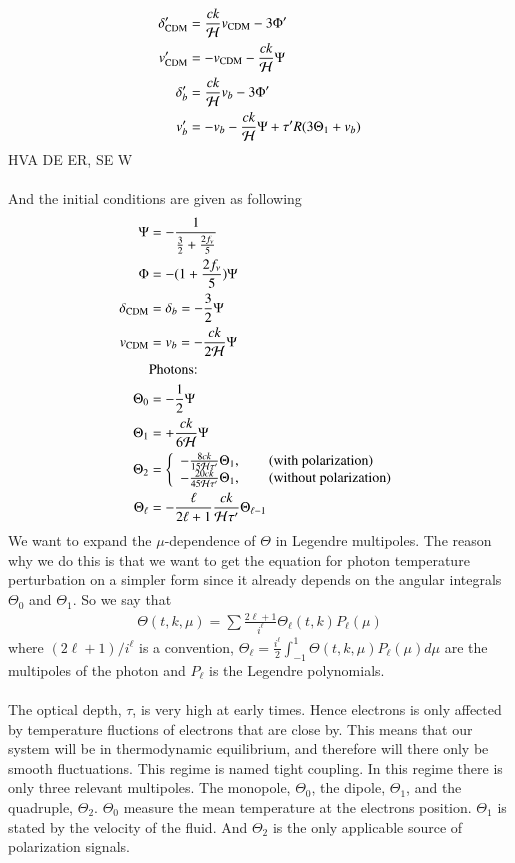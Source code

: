 \documentclass{aa}
\begin{document}
\begin{align}
\delta_{\rm CDM}^\prime &= \frac{ck}{\mathcal{H}} v_{\rm CDM} - 3\Phi^\prime \\
v_{\rm CDM}^\prime &= -v_{\rm CDM} -\frac{ck}{\mathcal{H}} \Psi \\
\delta_b^\prime &= \frac{ck}{\mathcal{H}}v_b -3\Phi^\prime \\
v_b^\prime &= -v_b - \frac{ck}{\mathcal{H}}\Psi + \tau^\prime R(3\Theta_1 + v_b) 
\end{align}
HVA DE ER, SE W\\
\\
And the initial conditions are given as following
\begin{align*}
\Psi &= -\frac{1}{\frac{3}{2} + \frac{2f_\nu}{5}}\\
\Phi &= -(1+\frac{2f_\nu}{5})\Psi \\
\delta_{\rm CDM} &= \delta_b = -\frac{3}{2} \Psi \\
v_{\rm CDM} &= v_b = -\frac{ck}{2\mathcal{H}} \Psi\\
&\text{Photons:}\\
\Theta_0 &= -\frac{1}{2} \Psi \\
\Theta_1 &= +\frac{ck}{6\mathcal{H}}\Psi \\
\Theta_2 &= \left\{
\begin{array}{l}
-\frac{8ck}{15\mathcal{H}\tau^\prime} \Theta_1, \quad\quad \textrm{(with polarization)} \\
-\frac{20ck}{45\mathcal{H}\tau^\prime} \Theta_1, \quad\quad \textrm{(without polarization)}
\end{array}\right. \\
\Theta_\ell &= -\frac{\ell}{2\ell+1} \frac{ck}{\mathcal{H}\tau^\prime} \Theta_{\ell-1}
\end{align*}
We want to expand the $\mu$-dependence of $\Theta$ in Legendre multipoles. The reason why we do this is that we want to get the equation for photon temperature perturbation on a simpler form since it already depends on the  angular integrals $\Theta_0$ and $\Theta_1$. So we say that
\begin{align}
    \Theta(t,k,\mu) = \sum \frac{2\ell + 1}{i^\ell}\Theta_\ell(t,k) P_\ell(\mu)
\end{align}
where $(2\ell+1)/i^\ell$ is a convention, $\Theta_\ell = \frac{i^\ell}{2}\int_{-1}^1 \Theta(t,k,\mu) P_\ell(\mu)d\mu$ are the multipoles of the photon and $P_\ell$ is the Legendre polynomials. 
\\
\\
The optical depth, $\tau$, is very high at early times. Hence electrons is only affected by temperature fluctions of electrons that are close by. This means that our system will be in thermodynamic equilibrium, and therefore will there only be smooth fluctuations. This regime is named tight coupling. In this regime there is only three relevant multipoles. The monopole, $\Theta_0$, the dipole, $\Theta_1$, and the quadruple, $\Theta_2$. $\Theta_0$ measure the mean temperature at the electrons position. $\Theta_1$ is stated by the velocity of the fluid. And $\Theta_2$ is the only applicable source of polarization signals. 
\end{document}

